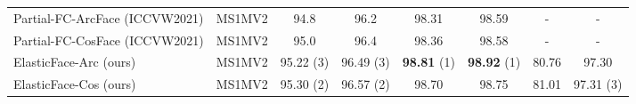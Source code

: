 \documentclass[letterpaper, 10 pt, conference]{ieeeconf}  \usepackage{times}
\begin{document}
\begin{table*}[ht!]
{\begin{tabular}{|l|c|c|c|c|c|c|c|}
Partial-FC-ArcFace \cite{an2020partical_fc} (ICCVW2021)     & MS1MV2 \cite{DBLP:conf/eccv/GuoZHHG16,deng2019arcface}                                                                     & 94.8           & 96.2           & 98.31          & 98.59                                                          & -              & -                                                              \\
Partial-FC-CosFace \cite{an2020partical_fc} (ICCVW2021)    & MS1MV2 \cite{DBLP:conf/eccv/GuoZHHG16,deng2019arcface}                                                                     & 95.0             & 96.4           & 98.36          & 98.58                                                          & -              & -                                                              \\ \hline
ElasticFace-Arc (ours)   & MS1MV2  \cite{DBLP:conf/eccv/GuoZHHG16,deng2019arcface}                                                                    & 95.22  (3)        & 96.49 (3)         & \textbf{98.81} (1) & \textbf{98.92} (1)                                                & 80.76          &  97.30                                                          \\
ElasticFace-Cos (ours)   & MS1MV2 \cite{DBLP:conf/eccv/GuoZHHG16,deng2019arcface}                                                                     & 95.30 (2) & 96.57 (2) & 98.70           & 98.75                                                          & 81.01          & 97.31 (3)                                                         \\ 


\end{tabular}}
\end{table*}
\end{document}

